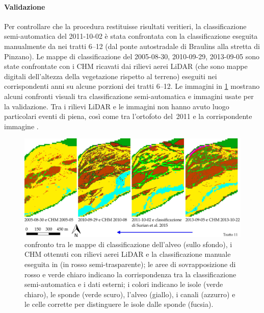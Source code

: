 \paragraph{Validazione}
Per controllare che la procedura restituisse risultati veritieri, la classificazione semi-automatica del 2011-10-02 è stata confrontata con la classificazione eseguita manualmente da  nei tratti \numrange[range-phrase={$\div$}]{6}{12} (dal ponte autostradale di Braulins alla stretta di Pinzano).
Le mappe di classificazione del 2005-08-30, 2010-09-29, 2013-09-05 sono state confrontate con i CHM ricavati dai rilievi aerei LiDAR (che sono mappe digitali dell'altezza della vegetazione rispetto al terreno) eseguiti nei corrispondenti anni su alcune porzioni dei tratti \numrange[range-phrase={$\div$}]{6}{12}.
Le immagini in \cref{fig:validazione-class-is-fl} mostrano alcuni confronti visuali tra classificazione semi-automatica e immagini usate per la validazione.
Tra i rilievi LiDAR e le immagini \AST{} non hanno avuto luogo particolari eventi di piena, così come tra l'ortofoto del~2011 e la corrispondente immagine \AST{}.
%	
\begin{figure}
	\centering
	\includegraphics[width=\textwidth]{files/class_mia_vs_surian_chm.jpeg}
	\caption[validazione visuale della classificazione dell'alveo]{confronto tra le mappe di classificazione dell'alveo (sullo sfondo), i CHM ottenuti con rilievi aerei LiDAR e la classificazione manuale eseguita in  (in rosso semi-trasparente); le aree di sovrapposizione di rosso e verde chiaro indicano la corrispondenza tra la classificazione semi-automatica e i dati esterni; i colori indicano le isole (verde chiaro), le sponde (verde scuro), l'alveo (giallo), i canali (azzurro) e le celle corrette per distinguere le isole dalle sponde (fucsia).}
	\label{fig:validazione-class-is-fl}
\end{figure}
%
